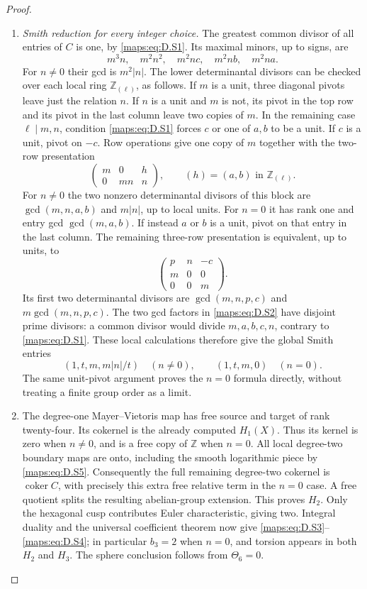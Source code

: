 \begin{proof}
\begin{enumerate}[label=\arabic*.,leftmargin=*]
\item \emph{Smith reduction for every integer choice.}
The greatest common divisor of all entries of $C$ is one,
by \eqref{maps:eq:D.S1}. Its maximal minors, up to signs, are
\[
 m^3n,\quad m^2n^2,\quad m^2nc,\quad m^2nb,\quad m^2na.
\]
For $n\ne0$ their gcd is $m^2|n|$.
The lower determinantal divisors can be checked over each
local ring $\mathbb Z_{(\ell)}$, as follows.
If $m$ is a unit, three diagonal pivots leave just the
relation $n$.
If $n$ is a unit and $m$ is not, its pivot in the top row
and its pivot in the last column leave two copies of $m$.
In the remaining case $\ell\mid m,n$, condition \eqref{maps:eq:D.S1}
forces $c$ or one of $a,b$ to be a unit.
If $c$ is a unit, pivot on $-c$. Row operations give one
copy of $m$ together with the two-row presentation
\[
 \begin{pmatrix}m&0&h\\0&mn&n\end{pmatrix},
 \qquad (h)=(a,b)\text{ in }\mathbb Z_{(\ell)}.
\]
For $n\ne0$ the two nonzero determinantal divisors of this block
are $\gcd(m,n,a,b)$ and $m|n|$, up to local units.
For $n=0$ it has rank one and entry gcd $\gcd(m,a,b)$.
If instead $a$ or $b$ is a unit, pivot on that entry in
the last column. The remaining three-row presentation is
equivalent, up to units, to
\[
 \begin{pmatrix}p&n&-c\\m&0&0\\0&0&m\end{pmatrix}.
\]
Its first two determinantal divisors are
$\gcd(m,n,p,c)$ and $m\gcd(m,n,p,c)$.
The two gcd factors in \eqref{maps:eq:D.S2} have disjoint prime divisors:
a common divisor would divide $m,a,b,c,n$, contrary to
\eqref{maps:eq:D.S1}. These local calculations therefore give the global
Smith entries
\[
 (1,t,m,m|n|/t)\quad(n\ne0),\qquad
 (1,t,m,0)\quad(n=0).
 \tag{D.S8}\label{maps:eq:D.S8}
\]
The same unit-pivot argument proves the $n=0$ formula
directly, without treating a finite group order as a limit.

\item The degree-one Mayer--Vietoris map has free source and
target of rank twenty-four. Its cokernel is the already
computed $H_1(X)$. Thus its kernel is zero when $n\ne0$,
and is a free copy of $\mathbb Z$ when $n=0$.
All local degree-two boundary maps are onto, including
the smooth logarithmic piece by \eqref{maps:eq:D.S5}.
Consequently the full remaining degree-two cokernel is
$\operatorname{coker} C$, with precisely this extra free
relative term in the $n=0$ case. A free quotient splits
the resulting abelian-group extension. This proves $H_2$.
Only the hexagonal cusp contributes Euler characteristic,
giving two. Integral duality and the universal coefficient
theorem now give \eqref{maps:eq:D.S3}--\eqref{maps:eq:D.S4}; in particular $b_3=2$
when $n=0$, and torsion appears in both $H_2$ and $H_3$.
The sphere conclusion follows from $\Theta_6=0$.


\end{enumerate}
\end{proof}
